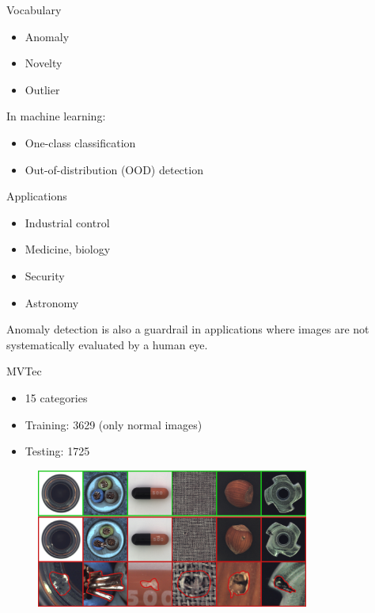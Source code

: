 \documentclass[xcolor=pdftex,dvipsnames,table,mathserif]{beamer}
\begin{document}
\begin{frame}{Vocabulary}

  \begin{itemize}
  \item Anomaly
  \item Novelty
  \item Outlier
  \end{itemize}

  In machine learning:

\begin{itemize}
\item One-class classification
\item Out-of-distribution (OOD) detection
\end{itemize}


\end{frame}


\begin{frame}{Applications}

\begin{itemize}
\item Industrial control
\item Medicine, biology
\item Security
\item Astronomy
\end{itemize}

\vspace{1em}
\pause
\begin{block}{}
Anomaly detection is also a guardrail in applications where images are not systematically evaluated by a human eye.
\end{block}

\end{frame}


\begin{frame}{MVTec~\tiny{\cite{bergmann_mvtec_2019}}}

\begin{itemize}
\item 15 categories
\item Training: 3629 (only normal images)
\item Testing: 1725
\end{itemize}

\begin{figure}[ht]
  \centering
  \includegraphics[width=0.8\textwidth]{mvtec}
\end{figure}

\end{frame}
\end{document}
